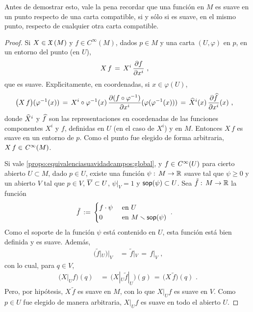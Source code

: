 Antes de demostrar esto, vale la pena recordar que una funci\'{o}n en $M$ es
suave en un punto respecto de una carta compatible, si y s\'{o}lo si es suave,
en el mismo punto, respecto de cualquier otra carta compatible.

\begin{proof}
	Si $X\in\mathfrak{X}\left(M\right)$ y $f\in C^\infty(M)$, dados $p\in M$ y una carta
	$(U,\varphi)$ en $p$, en un entorno del punto (en $U$),
	\begin{align*}
		X\,f & \,=\,X^i\,\frac{\partial{f}}{\partial{x^i}}
		\text{ ,}
	\end{align*}
	que es suave. Expl\'{\i}citamente, en coordenadas, si $x\in\varphi(U)$,
	\begin{align*}
		\big(X\,f\big)(\varphi^{-1}(x)) & \,=\,
			X^i\circ\varphi^{-1}(x)\,
				\frac{\partial{(f\circ\varphi^{-1})}}{\partial{x^i}}
					(\varphi(\varphi^{-1}(x))) \,=\,
			\widehat{X}^i(x)\,
				\frac{\partial{\ensuremath{\widehat{f}}}}{\partial{x^i}}(x)
		\text{ ,}
	\end{align*}
	donde $\widehat{X}^i$ y $\widehat{f}$ son las
	representaciones en coordenadas de las funciones componentes $X^i$ y
	$f$, definidas en $U$ (en el caso de $X^i$) y en $M$. Entonces $X\,f$
	es suave en un entorno de $p$. Como el punto fue elegido de forma
	arbitraria, $X\,f\in\mathit{C}^{\infty}(M)$.

	Si vale \ref{propo:equivalenciasuavidadcampos:global}, y
	$f\in\mathit{C}^{\infty}(U)$ para cierto abierto $U\subset M$, dado $p\in U$, existe
	una funci\'{o}n $\psi:\,M\rightarrow\mathbb{R}$ suave tal que $\psi\geq 0$ y
	un abierto $V$ tal que $p\in V$, $\overline{V}\subset U$, $\psi|_V=1$ y
	$\mathsf{sop}(\psi)\subset U$. Sea $\tilde{f}:\,M\rightarrow\mathbb{R}$ la
	funci\'{o}n
	\begin{align*}
		\tilde{f} & \,:=\,
			\begin{cases}
				f\cdot\psi & \text{ en } U \\
				0 & \text{ en } M\smallsetminus\mathsf{sop}(\psi)
			\end{cases}
		\text{ .}
	\end{align*}
	Como el soporte de la funci\'{o}n $\psi$ est\'{a} contenido en $U$,
	esta funci\'{o}n est\'{a} bien definida y es suave. Adem\'{a}s,
	\begin{align*}
		\big(\tilde f|_U\big)|_V & \,=\,\tilde f|_V \,=\,f|_V
		\text{ ,}
	\end{align*}
	con lo cual, para $q\in V$,
	\begin{align*}
		\big(X|_Uf\big)(q) & \,=\,\big(X|_U\tilde f|_U\big)(g) \,=\,
			\big(X\,\tilde f\big)(q)
		\text{ .}
	\end{align*}
	Pero, por hip\'{o}tesis, $X\,\tilde f$ es suave en $M$, con lo que
	$X|_Uf$ es suave en $V$. Como $p\in U$ fue elegido de manera
	arbitraria, $X|_Uf$ es suave en todo el abierto $U$.


\end{proof}

